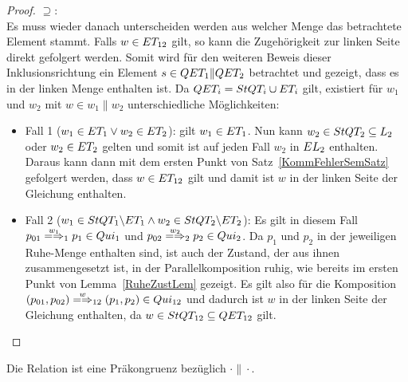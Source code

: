 \begin{proof}
  \glqq$\supseteq$\grqq{}:\\
  Es muss wieder danach unterscheiden werden aus welcher Menge das betrachtete
  Element stammt. Falls $w\in ET _{12}$ gilt, so kann die Zugehörigkeit zur
  linken Seite direkt gefolgert werden. Somit wird für den weiteren Beweis
  dieser Inklusionsrichtung ein Element $s\in QET _1\|QET _2$ betrachtet und
  gezeigt, dass es in der linken Menge enthalten ist. Da $QET _i=StQT _i\cup
  ET _i$ gilt, existiert für $w_1$ und $w_2$ mit $w\in w_1\|w_2$
  unterschiedliche Möglichkeiten:
  \begin{itemize}
    \item Fall 1 ($w_1\in ET _1\lor w_2\in ET _2$): \OBdA{} gilt $w_1\in ET
      _1$. Nun kann $w_2\in StQT _2\subseteq L_2$ oder $w_2\in ET _2$ gelten
      und somit ist auf jeden Fall $w_2$ in $EL _2$ enthalten. Daraus kann
      dann mit dem ersten Punkt von Satz~\ref{KommFehlerSemSatz} gefolgert
      werden, dass $w\in ET _{12}$ gilt und damit ist $w$ in der linken Seite
      der Gleichung enthalten.
    \item Fall 2 ($w_1\in StQT _1\backslash ET _1\land w_2\in StQT _2\backslash
      ET _2$): Es gilt in diesem Fall $p_{01} \weakmay[w_1]_1 p_1\in Qui_1$
      und $p_{02} \weakmay[w_2]_2 p_2\in Qui_2$. Da $p_1$ und $p_2$ in der
      jeweiligen Ruhe-Menge enthalten sind, ist auch der Zustand, der aus ihnen
      zusammengesetzt ist, in der Parallelkomposition ruhig, wie bereits im
      ersten Punkt von Lemma~\ref{RuheZustLem} gezeigt. Es gilt also für die
      Komposition $(p_{01},p_{02}) \weakmay[w]_{12} (p_1,p_2)\in Qui_{12}$ und
      dadurch ist $w$ in der linken Seite der Gleichung enthalten, da $w\in
      StQT _{12}\subseteq QET _{12}$ gilt.
  \end{itemize}
\end{proof}

\begin{Kor}
  Die Relation \QRel{} ist eine Präkongruenz bezüglich $\cdot\|\cdot$.
\end{Kor}

